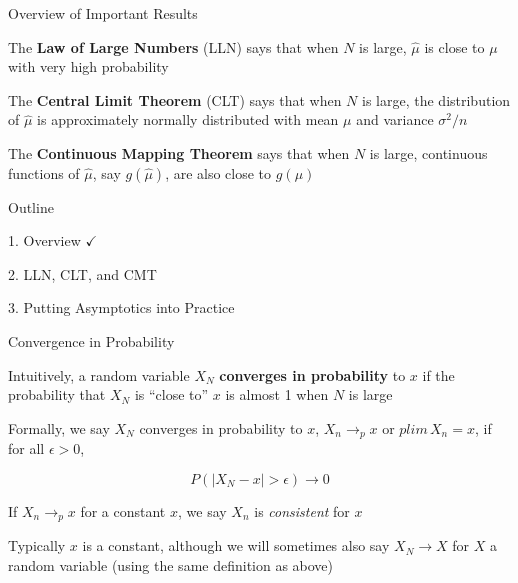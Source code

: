 \documentclass[11pt,english,handout]{beamer}
\newenvironment{wideitemize}{\itemize\addtolength{\itemsep}{10pt}}{\enditemize}
\begin{document}
\begin{frame}{Overview of Important Results}
	
\begin{wideitemize}

\item The \textbf{Law of Large Numbers} (LLN) says that when $N$ is large, $\hat\mu$ is close to $\mu$ with very high probability

\pause
\item The \textbf{Central Limit Theorem} (CLT) says that when $N$ is large, the distribution of $\hat\mu$ is approximately normally distributed with mean $\mu$ and variance $\sigma^2/n$

\pause
\item The \textbf{Continuous Mapping Theorem} says that when $N$ is large, continuous functions of $\hat\mu$, say $g(\hat\mu)$, are also close to $g(\mu)$


\end{wideitemize}	
\end{frame}


\begin{frame}{Outline}

\textcolor{red!75!green!50!blue!25!gray}{1. Overview} $\checkmark$
\vspace{0.8cm}

2. LLN, CLT, and CMT
\vspace{0.8cm}

\textcolor{red!75!green!50!blue!25!gray}{3. Putting Asymptotics into Practice}

\end{frame}


\begin{frame}{Convergence in Probability}
	
\begin{wideitemize}
\item
Intuitively, a random variable $X_N$ \textbf{converges in probability} to $x$ if the probability that $X_N$ is ``close to'' $x$ is almost 1 when $N$ is large

\pause
\item
Formally, we say $X_N$ converges in probability to $x$,  $X_n \rightarrow_p x$ or $plim \, X_n =x $, if for all $\epsilon > 0$, 

$$P(|X_N - x| > \epsilon) \rightarrow 0 $$

\pause
\item 
If $X_n \rightarrow_p x$ for a constant $x$, we say $X_n$ is \textit{consistent} for $x$

\pause
\item
Typically $x$ is a constant, although we will sometimes also say $X_N \rightarrow X$ for $X$ a random variable (using the same definition as above)
	
\end{wideitemize}

\end{frame}
\end{document}
